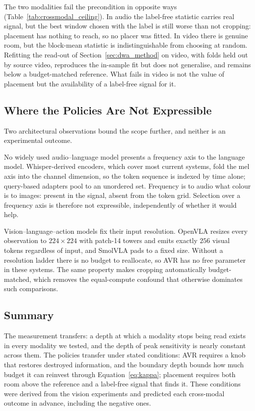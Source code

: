 The two modalities fail the precondition in opposite ways
(Table~\ref{tab:crossmodal_ceiling}). In audio the label-free statistic
carries real signal, but the best window chosen with the label is still
worse than not cropping: placement has nothing to reach, so no placer
was fitted. In video there is genuine room, but the block-mean statistic
is indistinguishable from choosing at random. Refitting the read-out of
Section~\ref{sec:dwa_method} on video, with folds held out by source video,
reproduces the in-sample fit but does not generalise, and remains below
a budget-matched reference. What fails in video is not the value of
placement but the availability of a label-free signal for it.

\subsection{Where the Policies Are Not Expressible}

Two architectural observations bound the scope further, and neither is
an experimental outcome.

No widely used audio--language model presents a frequency axis to the
language model. Whisper-derived encoders, which cover most current
systems, fold the mel axis into the channel dimension, so the token
sequence is indexed by time alone; query-based adapters pool to an
unordered set. Frequency is to audio what colour is to images: present
in the signal, absent from the token grid. Selection over a
frequency axis is therefore not expressible, independently of whether it
would help.

Vision--language--action models fix their input resolution. OpenVLA
resizes every observation to $224\times224$ with patch-14 towers and
emits exactly $256$ visual tokens regardless of input, and SmolVLA pads
to a fixed size. Without a resolution ladder there is no budget to
reallocate, so AVR has no free parameter in these systems. The same
property makes cropping automatically budget-matched, which removes the
equal-compute confound that otherwise dominates such comparisons.

\subsection{Summary}

The measurement transfers: a depth at which a modality stops being read
exists in every modality we tested, and the depth of peak sensitivity is
nearly constant across them. The policies transfer under stated
conditions: AVR requires a knob that restores destroyed information, and
the boundary depth bounds how much budget it can reinvest through
Equation~\ref{eq:kappa}; placement requires both room above the
reference and a label-free signal that finds it. These conditions were
derived from the vision experiments and predicted each cross-modal
outcome in advance, including the negative ones.
